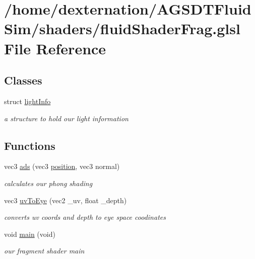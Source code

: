 \hypertarget{fluid_shader_frag_8glsl}{\section{/home/dexternation/\-A\-G\-S\-D\-T\-Fluid\-Sim/shaders/fluid\-Shader\-Frag.glsl File Reference}
\label{fluid_shader_frag_8glsl}
}
\subsection*{Classes}
\begin{DoxyCompactItemize}
\item 
struct \hyperlink{structlight_info}{light\-Info}
\begin{DoxyCompactList}\small\item\em a structure to hold our light information \end{DoxyCompactList}\end{DoxyCompactItemize}
\subsection*{Functions}
\begin{DoxyCompactItemize}
\item 
vec3 \hyperlink{fluid_shader_frag_8glsl_aa92a70677efb9df36d42919ab01aaaf4}{ads} (vec3 \hyperlink{thickness_vert_8glsl_af78042b263da1185c97c3202ced45aab}{position}, vec3 normal)
\begin{DoxyCompactList}\small\item\em calculates our phong shading \end{DoxyCompactList}\item 
vec3 \hyperlink{fluid_shader_frag_8glsl_abd810f8b2d0a0892c1c9d96228c3017d}{uv\-To\-Eye} (vec2 \-\_\-uv, float \-\_\-depth)
\begin{DoxyCompactList}\small\item\em converts uv coords and depth to eye space coodinates \end{DoxyCompactList}\item 
\hypertarget{fluid_shader_frag_8glsl_a6288eba0f8e8ad3ab1544ad731eb7667}{void \hyperlink{fluid_shader_frag_8glsl_a6288eba0f8e8ad3ab1544ad731eb7667}{main} (void)}\label{fluid_shader_frag_8glsl_a6288eba0f8e8ad3ab1544ad731eb7667}

\begin{DoxyCompactList}\small\item\em our fragment shader main \end{DoxyCompactList}\end{DoxyCompactItemize}
